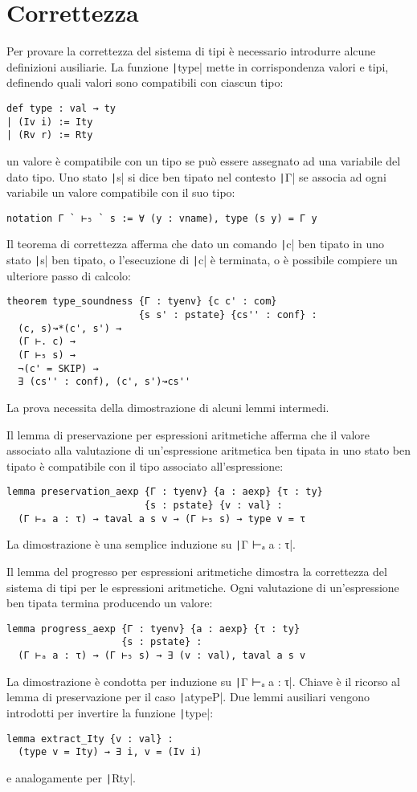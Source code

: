 \section{Correttezza}
Per provare la correttezza del sistema di tipi è necessario introdurre alcune definizioni ausiliarie. La funzione \texttt|type| mette in corrispondenza valori e tipi, definendo quali valori sono compatibili con ciascun tipo:
\begin{verbatim}
def type : val → ty
| (Iv i) := Ity
| (Rv r) := Rty
\end{verbatim}
un valore è compatibile con un tipo se può essere assegnato ad una variabile del dato tipo. Uno stato \texttt|s| si dice ben tipato nel contesto \texttt|Γ| se associa ad ogni variabile un valore compatibile con il suo tipo:
\begin{verbatim}
notation Γ ` ⊢₅ ` s := ∀ (y : vname), type (s y) = Γ y
\end{verbatim}

Il teorema di correttezza afferma che dato un comando \texttt|c| ben tipato in uno stato \texttt|s| ben tipato, o l'esecuzione di \texttt|c| è terminata, o è possibile compiere un ulteriore passo di calcolo:
\begin{verbatim}
theorem type_soundness {Γ : tyenv} {c c' : com} 
                       {s s' : pstate} {cs'' : conf} :
  (c, s)↝*(c', s') → 
  (Γ ⊢. c) → 
  (Γ ⊢₅ s) → 
  ¬(c' = SKIP) → 
  ∃ (cs'' : conf), (c', s')↝cs''
\end{verbatim}
La prova necessita della dimostrazione di alcuni lemmi intermedi.

Il lemma di preservazione per espressioni aritmetiche afferma che il valore associato alla valutazione di un'espressione aritmetica ben tipata in uno stato ben tipato è compatibile con il tipo associato all'espressione:
\begin{verbatim}
lemma preservation_aexp {Γ : tyenv} {a : aexp} {τ : ty} 
                        {s : pstate} {v : val} : 
  (Γ ⊢ₐ a : τ) → taval a s v → (Γ ⊢₅ s) → type v = τ
\end{verbatim}
La dimostrazione è una semplice induzione su \texttt|Γ ⊢ₐ a : τ|.

Il lemma del progresso per espressioni aritmetiche dimostra la correttezza del sistema di tipi per le espressioni aritmetiche. Ogni valutazione di un'espressione ben tipata termina producendo un valore:
\begin{verbatim}
lemma progress_aexp {Γ : tyenv} {a : aexp} {τ : ty} 
                    {s : pstate} :
  (Γ ⊢ₐ a : τ) → (Γ ⊢₅ s) → ∃ (v : val), taval a s v
\end{verbatim}
La dimostrazione è condotta per induzione su \texttt|Γ ⊢ₐ a : τ|. Chiave è il ricorso al lemma di preservazione per il caso \texttt|atypeP|.
Due lemmi ausiliari vengono introdotti per invertire la funzione \texttt|type|:
\begin{verbatim}
lemma extract_Ity {v : val} :
  (type v = Ity) → ∃ i, v = (Iv i) 
\end{verbatim}
e analogamente per \texttt|Rty|.

